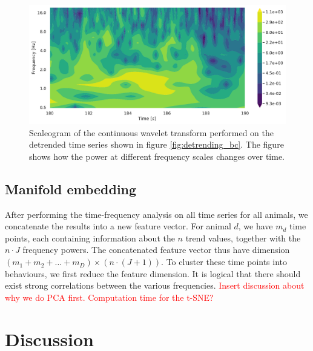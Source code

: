 \documentclass[a4paper, 10pt]{memoir}
\theoremstyle{plain}
\theoremstyle{definition}
\theoremstyle{remark}
\begin{document}
\begin{figure}[tb]
        \centering
        \includegraphics[width=\linewidth]{./code/figures/scaleograms/scaleogram_animal_1_BackPitch.pdf}
        \caption{Scaleogram of the continuous wavelet transform performed on the detrended time series shown in figure \ref{fig:detrending_bc}.
        The figure shows how the power at different frequency scales changes over time.}
        \label{fig:scaleogram_bc}
\end{figure}




\section{Manifold embedding}
After performing the time-frequency analysis on all time series for all animals, we concatenate the results into a new feature vector.
For animal $d$, we have $m_d$ time points, each containing information about the $n$ trend values, together with the $n \cdot J$ frequency powers.
The concatenated feature vector thus have dimension $(m_1 + m_2 + \hdots + m_D) \times (n \cdot (J + 1))$.
To cluster these time points into behaviours, we first reduce the feature dimension.
It is logical that there should exist strong correlations between the various frequencies.
\textcolor{red}{Insert discussion about why we do PCA first. Computation time for the t-SNE?}







\chapter{Discussion}
\end{document}
